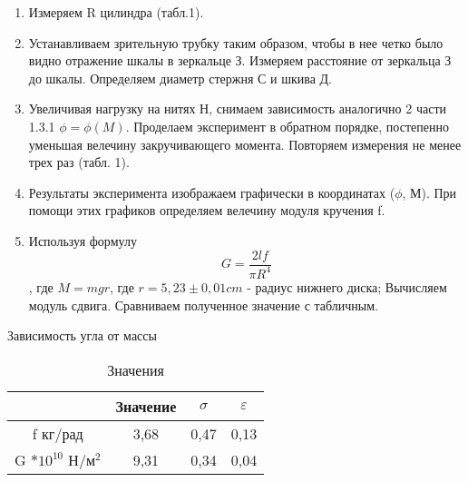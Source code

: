 \documentclass[a4paper, 12pt]{article}%
\begin{document}
\begin{figure}[h]
\end{figure}
\begin{enumerate}
\item Измеряем R цилиндра (табл.1).
\item Устанавливаем зрительную трубку таким образом, чтобы в нее четко было видно отражение шкалы в зеркальце З. Измеряем расстояние от зеркальца З до шкалы. Определяем диаметр стержня С и шкива Д.
\item Увеличивая нагрузку на нитях Н, снимаем зависимость аналогично 2 части 1.3.1 $\phi = \phi (M)$. Проделаем эксперимент в обратном порядке, постепенно уменьшая велечину закручивающего момента. Повторяем измерения не менее трех раз (табл. 1). 
\item Результаты эксперимента изображаем графически в координатах ($\phi$, М). При помощи этих графиков определяем велечину модуля кручения f. 
\item Используя формулу 
\[G = \dfrac{2lf}{\pi R^4}\]
, где $ M = mgr$, где $r = 5,23\pm0,01 cm$ - радиус нижнего диска;
Вычисляем модуль сдвига. Сравниваем полученное значение с табличным. 
\end{enumerate}
\begin{table}
\caption{Зависимость угла от массы}
\begin{tabular}{|c|c|c|c|}
\hline
&Значение&$\sigma$&$\varepsilon$\\
\hline
f кг/рад&3,68&0,47&0,13\\
\hline
G $*10^{10}$ $\text{Н}/\text{м}^2$ &9,31&0,34&0,04\\
\hline
\end{tabular}
\caption{Значения}
\end{table}
\end{document}
